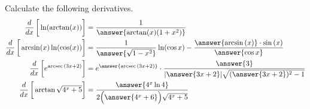 \documentclass{ximera}
\author{Nela Lakos}
\DeclareMathOperator{\arcsec}{arcsec}
\begin{document}
\begin{exercise}

Calculate the following derivatives.
\begin{align*}
\frac{d}{dx}\left[\vphantom{\frac{d}{dx}}\ln(\arctan(x))\right] &= \frac{1}{\answer{\arctan(x)(1+x^2)}}\\
\frac{d}{dx}\left[\vphantom{\frac{d}{dx}}\arcsin(x)\ln(\cos(x))\right] &=\dfrac{1}{ \answer{\sqrt{1-x^2}}}\ln(\cos{x}) - \dfrac{\answer{\arcsin{(x)}}\cdot\sin{(x)}}{\answer{\cos{x}}}\\
\frac{d}{dx}\left[\vphantom{\frac{d}{dx}}e^{\arcsec{\left(3x+2\right)}}\right] &=e^{ \answer{\arcsec{\left(3x+2\right)}}}\cdot\dfrac{\answer{3}}{|\answer{3x+2}|\sqrt{(\answer{3x+2})^2-1}}\\
\frac{d}{dx}\left[\vphantom{\frac{d}{dx}}\arctan{\sqrt{4^x +5}}\right] &=\dfrac{\answer{4^{x}\ln{4}}}{2\Bigl(\answer{4^{x}+6}\Bigr)\sqrt{4^{x}+5}}
\end{align*}
\end{exercise}
\end{document}
